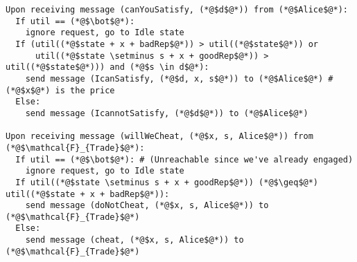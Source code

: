 \begin{lstlisting}[label=satprot, style=numbers]
Upon receiving message (canYouSatisfy, (*@$d$@*)) from (*@$Alice$@*):
  If util == (*@$\bot$@*):
    ignore request, go to Idle state
  If (util((*@$state + x + badRep$@*)) > util((*@$state$@*)) or
      util((*@$state \setminus s + x + goodRep$@*)) > util((*@$state$@*))) and (*@$s \in d$@*):
    send message (IcanSatisfy, (*@$d, x, s$@*)) to (*@$Alice$@*) # (*@$x$@*) is the price
  Else:
    send message (IcannotSatisfy, (*@$d$@*)) to (*@$Alice$@*)

Upon receiving message (willWeCheat, (*@$x, s, Alice$@*)) from (*@$\mathcal{F}_{Trade}$@*):
  If util == (*@$\bot$@*): # (Unreachable since we've already engaged)
    ignore request, go to Idle state
  If util((*@$state \setminus s + x + goodRep$@*)) (*@$\geq$@*) util((*@$state + x + badRep$@*)):
    send message (doNotCheat, (*@$x, s, Alice$@*)) to (*@$\mathcal{F}_{Trade}$@*)
  Else:
    send message (cheat, (*@$x, s, Alice$@*)) to (*@$\mathcal{F}_{Trade}$@*)
\end{lstlisting}
